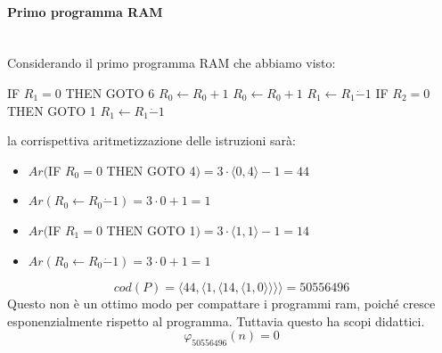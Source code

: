 \documentclass{article}
\begin{document}
\paragraph{Primo programma RAM}\mbox{}\\
Considerando il primo programma RAM che abbiamo visto:
\begin{algorithm}[hbt!]
    \caption{$P,\varphi_P(n)=2n$}\label{alg:varphi_2n}
    {IF $R_1=0$ THEN GOTO 6}\;
    $R_0\leftarrow R_0+1$\;
    $R_0\leftarrow R_0+1$\;
    $R_1\leftarrow R_1\dot{-}1$\;
    {IF $R_2=0$ THEN GOTO 1}\;
    $R_1\leftarrow R_1\dot{-}1$
\end{algorithm}
la corrispettiva aritmetizzazione delle istruzioni sarà:
\begin{itemize}
    \item $Ar($IF $R_0=0$ THEN GOTO 4$)=3\cdot\langle0,4\rangle-1=44$
    \item $Ar(R_0\leftarrow R_0\dot{-}1)=3\cdot 0+1=1$
    \item $Ar($IF $R_1=0$ THEN GOTO 1$)=3\cdot\langle1,1\rangle-1=14$
    \item $Ar(R_0\leftarrow R_0\dot{-}1)=3\cdot 0+1=1$
\end{itemize}
$$cod(P)=\langle 44,\langle 1,\langle 14,\langle 1,0\rangle\rangle\rangle\rangle=50556496$$
Questo non è un ottimo modo per compattare i programmi ram, poiché cresce esponenzialmente
rispetto al programma. Tuttavia questo ha scopi didattici.
$$\varphi_{50556496}(n)=0$$
\end{document}
